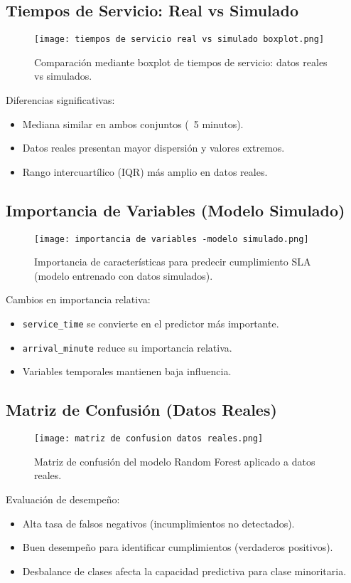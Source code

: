 \documentclass[12pt]{article}
\begin{document}
\subsection{Tiempos de Servicio: Real vs Simulado}
\begin{figure}[H]
  \centering
  \texttt{[image: tiempos de servicio real vs simulado boxplot.png]}
  \caption{Comparación mediante boxplot de tiempos de servicio: datos reales vs simulados.}
\end{figure}
\noindent
Diferencias significativas:
\begin{itemize}
  \item Mediana similar en ambos conjuntos (~5 minutos).
  \item Datos reales presentan mayor dispersión y valores extremos.
  \item Rango intercuartílico (IQR) más amplio en datos reales.
\end{itemize}

\subsection{Importancia de Variables (Modelo Simulado)}
\begin{figure}[H]
  \centering
  \texttt{[image: importancia de variables -modelo simulado.png]}
  \caption{Importancia de características para predecir cumplimiento SLA (modelo entrenado con datos simulados).}
\end{figure}
\noindent
Cambios en importancia relativa:
\begin{itemize}
  \item \texttt{service\_time} se convierte en el predictor más importante.
  \item \texttt{arrival\_minute} reduce su importancia relativa.
  \item Variables temporales mantienen baja influencia.
\end{itemize}

\subsection{Matriz de Confusión (Datos Reales)}
\begin{figure}[H]
  \centering
  \texttt{[image: matriz de confusion datos reales.png]}
  \caption{Matriz de confusión del modelo Random Forest aplicado a datos reales.}
\end{figure}
\noindent
Evaluación de desempeño:
\begin{itemize}
  \item Alta tasa de falsos negativos (incumplimientos no detectados).
  \item Buen desempeño para identificar cumplimientos (verdaderos positivos).
  \item Desbalance de clases afecta la capacidad predictiva para clase minoritaria.
\end{itemize}
\end{document}
